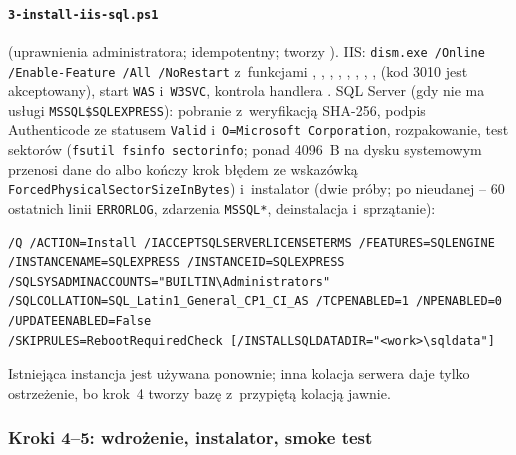 \paragraph{\texttt{3-install-iis-sql.ps1}}\label{sec:bench-krok3} (uprawnienia
administratora; idempotentny; tworzy ). IIS: \texttt{dism.exe /Online
/Enable-Feature /All /NoRestart} z~funkcjami ,
, , ,
, ,
, ,  (kod 3010
jest akceptowany), start \texttt{WAS} i~\texttt{W3SVC}, kontrola handlera
. SQL Server (gdy nie ma usługi
\texttt{MSSQL\$SQLEXPRESS}): pobranie z~weryfikacją SHA-256, podpis Authenticode ze
statusem \texttt{Valid} i~\texttt{O=Microsoft Corporation}, rozpakowanie, test sektorów
(\texttt{fsutil fsinfo sectorinfo}; ponad 4096~B na dysku systemowym przenosi dane do
 albo kończy krok błędem ze wskazówką
\texttt{ForcedPhysicalSectorSizeInBytes}) i~instalator (dwie próby; po nieudanej -- 60
ostatnich linii \texttt{ERRORLOG}, zdarzenia \texttt{MSSQL*}, deinstalacja i~sprzątanie):

\begin{lstlisting}
/Q /ACTION=Install /IACCEPTSQLSERVERLICENSETERMS /FEATURES=SQLENGINE
/INSTANCENAME=SQLEXPRESS /INSTANCEID=SQLEXPRESS /SQLSYSADMINACCOUNTS="BUILTIN\Administrators"
/SQLCOLLATION=SQL_Latin1_General_CP1_CI_AS /TCPENABLED=1 /NPENABLED=0 /UPDATEENABLED=False
/SKIPRULES=RebootRequiredCheck [/INSTALLSQLDATADIR="<work>\sqldata"]
\end{lstlisting}

Istniejąca instancja jest używana ponownie; inna kolacja serwera daje tylko ostrzeżenie,
bo krok~4 tworzy bazę z~przypiętą kolacją jawnie.


\subsubsection{Kroki 4--5: wdrożenie, instalator, smoke test}\label{sec:bench-krok4}

